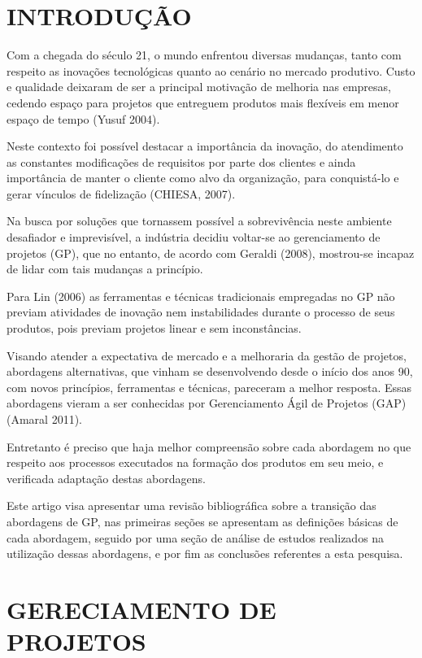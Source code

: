 \onehalfspacing

\section{INTRODUÇÃO}

Com a chegada do século 21, o mundo enfrentou diversas mudanças, tanto com respeito as inovações tecnológicas quanto ao cenário no mercado produtivo. Custo e qualidade deixaram de ser a principal motivação de melhoria nas empresas, cedendo espaço para projetos que entreguem produtos mais flexíveis em menor espaço de tempo (Yusuf 2004).

Neste contexto foi possível destacar a importância da inovação, do atendimento as constantes modificações de requisitos por parte dos clientes e ainda importância de manter o cliente como alvo da organização, para conquistá-lo e gerar vínculos de fidelização (CHIESA, 2007).

Na busca por soluções que tornassem possível a sobrevivência neste ambiente desafiador e imprevisível, a indústria decidiu voltar-se ao gerenciamento de projetos (GP), que no entanto, de acordo com Geraldi (2008), mostrou-se incapaz de lidar com tais mudanças a princípio.

Para Lin (2006) as ferramentas e técnicas tradicionais empregadas no GP não previam atividades de inovação nem instabilidades durante o processo de seus produtos, pois previam projetos linear e sem inconstâncias.

Visando atender a expectativa de mercado e a melhoraria da gestão de projetos, abordagens alternativas, que vinham se desenvolvendo desde o início dos anos 90, com novos princípios, ferramentas e técnicas, pareceram a melhor resposta. Essas abordagens vieram a ser conhecidas por Gerenciamento Ágil de Projetos (GAP) (Amaral 2011).

Entretanto é preciso que haja melhor compreensão sobre cada abordagem no que respeito aos processos executados na formação dos produtos em seu meio, e verificada adaptação destas abordagens.

Este artigo visa apresentar uma revisão bibliográfica sobre a transição das abordagens de GP, nas primeiras seções se apresentam as definições básicas de cada abordagem, seguido por uma seção de análise de estudos realizados na utilização dessas abordagens, e por fim as conclusões referentes a esta pesquisa.

\section{GERECIAMENTO DE PROJETOS}

